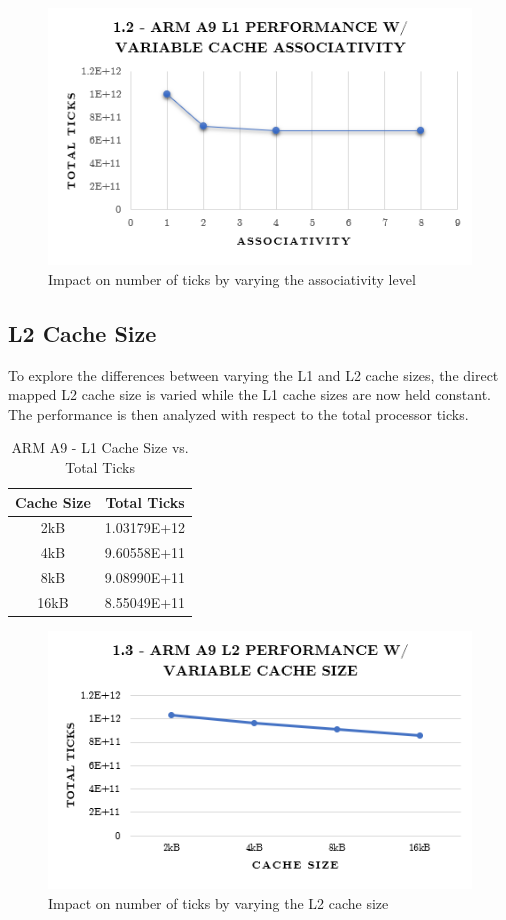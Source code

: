\documentclass[a4paper, 10pt, conference]{ieeeconf}      %
\begin{document}
\begin{figure}[thpb]
\centering
\includegraphics[scale=.5]{ex1_2.png}
\caption{Impact on number of ticks by varying the associativity level}
\label{fig:ticks_assoc}
\end{figure}

\subsection{L2 Cache Size}

To explore the differences between varying the L1 and L2 cache sizes, the direct mapped L2 cache size is varied while the L1 cache sizes are now held constant. The performance is then analyzed with respect to the total processor ticks.


\begin{table}[h]
\caption{ARM A9 - L1 Cache Size vs. Total Ticks}
\label{tab:A9}
\begin{center}
\begin{tabular}{|c||c|}
\hline
Cache Size & Total Ticks\\
\hline
2kB & 1.03179E+12 \\ \hline
4kB & 9.60558E+11 \\ \hline
8kB & 9.08990E+11 \\ \hline
16kB & 8.55049E+11 \\ \hline
\end{tabular}
\end{center}
\end{table}

\begin{figure}[thpb]
\centering
\includegraphics[scale=.5]{ex1_3.png}
\caption{Impact on number of ticks by varying the L2 cache size}
\label{figurelabel}
\end{figure}
\end{document}
